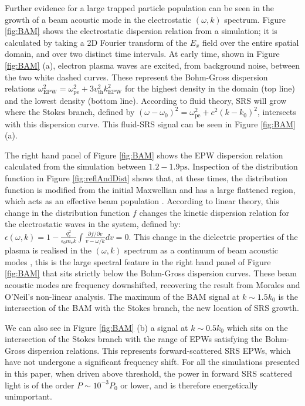 Further evidence for a large trapped particle population can be seen in the growth of a beam acoustic mode in the electrostatic $(\omega,k)$ spectrum. Figure \ref{fig:BAM} shows the electrostatic dispersion relation from a simulation; it is calculated by taking a 2D Fourier transform of the $E_x$ field over the entire spatial domain, and over two distinct time intervals. At early time, shown in Figure \ref{fig:BAM} (a), electron plasma waves are excited, from background noise, between the two white dashed curves. These
represent the Bohm-Gross dispersion relations $\omega_\mathrm{EPW}^2 = \omega_{\mathrm{pe}}^2 + 3v_\mathrm{th}^2k_\mathrm{EPW}^2$ for the highest density in the
domain (top line) and the lowest density (bottom line). According to fluid theory, SRS will grow where the  Stokes branch, defined by $(\omega-\omega_0)^2 = \omega_{\mathrm{pe}}^2 + c^2(k-k_0)^2$, intersects
with this dispersion curve. This fluid-SRS signal can be seen in Figure \ref{fig:BAM} (a).

The right hand panel of Figure \ref{fig:BAM} shows the EPW dispersion relation calculated from the simulation between $1.2 - 1.9
\si{\pico\second}$. Inspection of the distribution function in Figure \ref{fig:reflAndDist} shows that, at these times, the distribution
function is modified from the initial Maxwellian and has a large flattened region, which acts as an effective beam population
\citep{Yin2006}. According to  linear theory, this change in the distribution function $f$ changes the kinetic dispersion relation for the electrostatic waves in the system, defined by: $\epsilon(\omega,k) = 1 - \frac{q_e^2}{\epsilon_0m_ek}\int\frac{\partial{f}/\partial{v}}{v-\omega/k} dv = 0$.
This change in the dielectric properties of the plasma is realised in the $(\omega,k)$ spectrum as a continuum of beam acoustic
modes \citep{Yin2006}, this is the large spectral feature in the right hand panel of Figure \ref{fig:BAM} that sits strictly below
the Bohm-Gross dispersion curves.
These beam acoustic modes are frequency downshifted, recovering the result from Morales and O'Neil's non-linear analysis\citep{Morales1972}. The maximum of the BAM signal at $k \sim 1.5k_0$ is the intersection of the BAM with the Stokes
branch, the new location of SRS growth.

We can also see in Figure \ref{fig:BAM} (b) a signal at $k\sim 0.5k_0$ which sits on the intersection of the Stokes branch with the range of EPWs satisfying the Bohm-Gross dispersion relations. This represents forward-scattered SRS EPWs, which have not undergone a significant frequency shift. For all the simulations presented in this paper, when driven above threshold, the power in forward SRS scattered light is of the order $P \sim 10^{-3} P_0$ or lower, and is therefore energetically unimportant.


